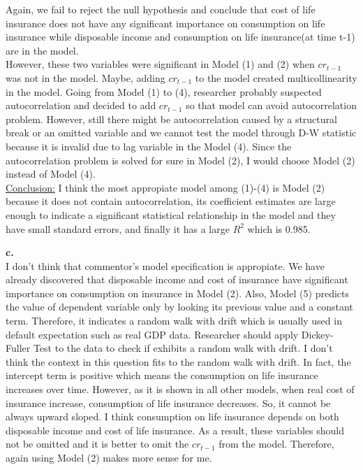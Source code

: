 \documentclass{article}
\begin{document}
Again, we fail to reject the null hypothesis and conclude that cost of life insurance does not have any significant importance on consumption on life insurance while disposable income and consumption on life insurance(at time t-1) are in the model.
\\

However, these two variables were significant in Model (1) and (2) when $cr_{t-1}$ was not in the model. Maybe, adding $cr_{t-1}$ to the model created multicollinearity in the model. Going from Model (1) to (4), researcher probably suspected autocorrelation and decided to add $cr_{t-1}$ so that model can avoid autocorrelation problem. However, still there might be autocorrelation caused by a structural break or an omitted variable and we cannot test the model through D-W statistic because it is invalid due to lag variable in the Model (4). Since the autocorrelation problem is solved for sure in Model (2), I would choose Model (2) instead of Model (4).
\\

\underline{Conclusion:} I think the most appropiate model among (1)-(4) is Model (2) because it does not contain autocorrelation, its coefficient estimates are large enough to indicate a significant statistical relationship in the model and they have small standard errors, and finally it has a large $R^2$ which is 0.985.
\\

\newpage

\textbf{c.}
\\

I don't think that commentor's model specification is appropiate. We have already discovered that disposable income and cost of insurance have significant importance on consumption on insurance in Model (2). Also, Model (5) predicts the value of dependent variable only by looking its previous value and a constant term. Therefore, it indicates a random walk with drift which is usually used in default expectation such as real GDP data. Researcher should apply Dickey-Fuller Test to the data to check if exhibits a random walk with drift. I don't think the context in this question fits to the random walk with drift. In fact, the intercept term is positive which means the consumption on life insurance increases over time. However, as it is shown in all other models, when real cost of insurance increase, consumption of life insurance decreases. So, it cannot be always upward sloped. I think consumption on life insurance depends on both disposable income and cost of life insurance.  As a result, these variables should not be omitted and it is better to omit the $cr_{t-1}$ from the model. Therefore, again using Model (2) makes more sense for me.  
\\
\end{document}

